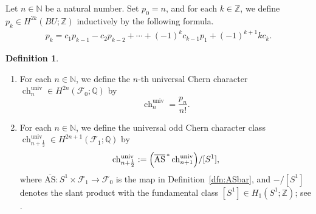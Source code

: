\documentclass{amsart}
\theoremstyle{definition}
\newtheorem{dfn}[thm]{Definition}
\theoremstyle{remark}
\newcommand{\N}{\mathbb{N}}
\begin{document}
Let $n \in \mathbb{N}$ be a natural number. Set $p_0 = n$, and for each $k \in \mathbb{Z}$, we define $p_k\in H^{2k}(BU; \mathbb{Z})$ inductively by the following formula.
\begin{align*}
p_k=c_1 p_{k-1}-c_2 p_{k-2}+\cdots +(-1)^{k}c_{k-1}p_1 +(-1)^{k+1}kc_k.
\end{align*}
\begin{dfn}\label{dfn:univ-chern}
\begin{enumerate}
\item For each $n \in \N$, we define the $n$-th universal Chern character
$\operatorname{ch}_n^{\mathrm{univ}} \in H^{2n}(\mathcal{F}_0; \mathbb{Q})$ by
\[
\operatorname{ch}_n^{\mathrm{univ}}=\frac{p_n}{n!}.
\]

\item For each $n \in \N$, we define the universal odd Chern character class
$\operatorname{ch}_{n+\frac{1}{2}}^{\mathrm{univ}} \in H^{2n+1}(\mathcal{F}_1;\mathbb{Q})$ by
\[
\operatorname{ch}_{n+\frac12}^{\mathrm{univ}}
:=\Bigl(\overline{\mathrm{AS}}^{\,*}\operatorname{ch}^{\mathrm{univ}}_{n+1}\Bigr)/[S^{1}],
\]
where $\overline{\mathrm{AS}}:S^{1}\times\mathcal{F}_{1}\to\mathcal{F}_{0}$ is the map
in Definition~\ref{dfn:ASbar}, and $-/[S^{1}]$ denotes the slant product with the fundamental
class $[S^{1}]\in H_{1}(S^{1};\mathbb{Z})$; see \cite{Hatcher}.
\end{enumerate}
\end{dfn}
\end{document}

